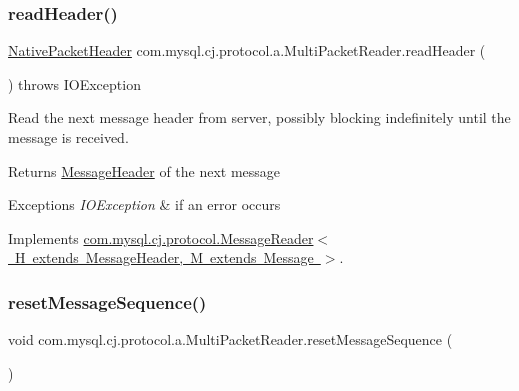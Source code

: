 \subsubsection{\texorpdfstring{read\+Header()}{readHeader()}}
{\footnotesize\ttfamily \mbox{\hyperlink{classcom_1_1mysql_1_1cj_1_1protocol_1_1a_1_1_native_packet_header}{Native\+Packet\+Header}} com.\+mysql.\+cj.\+protocol.\+a.\+Multi\+Packet\+Reader.\+read\+Header (\begin{DoxyParamCaption}{ }\end{DoxyParamCaption}) throws I\+O\+Exception}

Read the next message header from server, possibly blocking indefinitely until the message is received.

\begin{DoxyReturn}{Returns}
\mbox{\hyperlink{interfacecom_1_1mysql_1_1cj_1_1protocol_1_1_message_header}{Message\+Header}} of the next message 
\end{DoxyReturn}

\begin{DoxyExceptions}{Exceptions}
{\em I\+O\+Exception} & if an error occurs \\
\hline
\end{DoxyExceptions}


Implements \mbox{\hyperlink{interfacecom_1_1mysql_1_1cj_1_1protocol_1_1_message_reader_a09745b0e30f74fa13e2b32f22ce70cbb}{com.\+mysql.\+cj.\+protocol.\+Message\+Reader$<$ H extends Message\+Header, M extends Message $>$}}.

\mbox{\label{classcom_1_1mysql_1_1cj_1_1protocol_1_1a_1_1_multi_packet_reader_ac0fa7a5f40fc65548bdb17241152b81c}} 
\subsubsection{\texorpdfstring{reset\+Message\+Sequence()}{resetMessageSequence()}}
{\footnotesize\ttfamily void com.\+mysql.\+cj.\+protocol.\+a.\+Multi\+Packet\+Reader.\+reset\+Message\+Sequence (\begin{DoxyParamCaption}{ }\end{DoxyParamCaption})}

